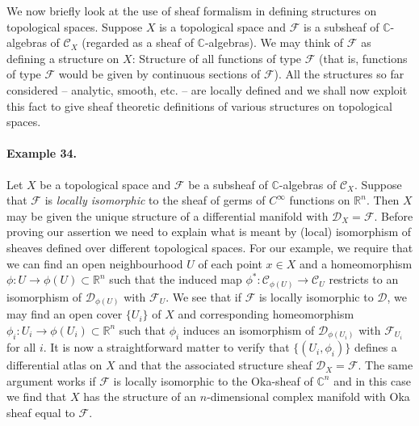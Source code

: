 We now briefly look at the use of sheaf formalism in defining structures on topological spaces. Suppose $X$ is a topological space and $\mathcal F$ is a subsheaf of $\mathbb C$-algebras of $\mathcal C_X$ (regarded as a sheaf of $\mathbb C$-algebras). We may think of $\mathcal F$ as defining a structure on $X$: Structure of all functions of type $\mathcal F$ (that is, functions of type $\mathcal F$ would be given by continuous sections of $\mathcal F$). All the structures so far considered -- analytic, smooth, etc. -- are locally defined and we shall now exploit this fact to give sheaf theoretic definitions of various structures on topological spaces.
\paragraph{Example 34.}
Let $X$ be a topological space and $\mathcal F$ be a subsheaf of $\mathbb C$-algebras of $\mathcal C_X$. Suppose that $\mathcal F$ is \emph{locally isomorphic} to the sheaf of germs of $C^\infty$ functions on $\mathbb R^n$. Then $X$ may be given the unique structure of a differential manifold with $\mathscr D_X=\mathcal F$. Before proving our assertion we need to explain what is meant by (local) isomorphism of sheaves defined over different topological spaces. For our example, we require that we can find an open neighbourhood $U$ of each point $x\in X$ and a homeomorphism $\phi:U\to\phi(U)\subset\mathbb R^n$ such that the induced map $\phi^*:\mathcal C_{\phi(U)}\to\mathcal C_U$ restricts to an isomorphism of $\mathscr D_{\phi(U)}$ with $\mathcal F_U$. We see that if $\mathcal F$ is locally isomorphic to $\mathscr D$, we may find an open cover $\{U_i\}$ of $X$ and corresponding homeomorphism $\phi_i:U_i\to\phi(U_i)\subset\mathbb R^n$ such that $\phi_i$ induces an isomorphism of $\mathscr D_{\phi(U_i)}$ with $\mathcal F_{U_i}$ for all $i$. It is now a straightforward matter to verify that $\{(U_i,\phi_i)\}$ defines a differential atlas on $X$ and that the associated structure sheaf $\mathscr D_X=\mathcal F$. The same argument works if $\mathcal F$ is locally isomorphic to the Oka-sheaf of $\mathbb C^n$ and in this case we find that $X$ has the structure of an $n$-dimensional complex manifold with Oka sheaf equal to $\mathcal F$.

